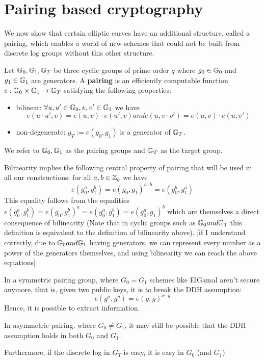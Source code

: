 \section{Pairing based cryptography}
We now show that certain elliptic curves have an additional structure,
called a pairing, which enables a world of new schemes that could not be built
 from discrete log groups without this other structure.

 \begin{defn}
  Let $\mathbb{G}_0, \mathbb{G}_1, \mathbb{G}_T$ be three cyclic groups of prime order $q$ where 
  $g_0\in\mathbb{G}_0$ and $g_1\in\mathbb{G}_1$ are generators. A \textbf{pairing} is an efficiently
  computable function $e: \mathbb{G}_0 \times \mathbb{G}_1 \to \mathbb{G}_T$ satisfying the 
  following properties:
  \begin{itemize}
    \item bilinear: $\forall u,u'\in\mathbb{G}_0, v,v'\in\mathbb{G}_1$  we have 
        $$ e(u\cdot u',v) = e(u,v) \cdot e(u',v) and  e(u,v\cdot v') = e(u,v)\cdot e(u,v')$$
    \item non-degenerate: $g_T := e(g_0,g_1)$  is a generator of $\mathbb{G}_T$.
  \end{itemize}
\end{defn}
We refer to $\mathbb{G}_0,\mathbb{G}_1$ as the pairing groups and $\mathbb{G}_T$ as the target group.

Bilinearity implies the following central property of pairing that will be used
in all our constructions: for all $a, b\in \mathbb{Z}_q$ we have
  $$ e(g_0^a,g_1^b)=e(g_0,g_1)^{a\cdot b}= e(g_0^b,g_1^a)$$
This equality follows from the equalities 
$e(g_0^a,g_1^b)=e(g_0,g_1^b)^a=e(g_0^a,g_1^b)=e(g_0^a,g_1)^b$
which are themselves a direct consequence of bilinearity (Note that in cyclic groups
 such as $\mathbb{G}_0 and \mathbb{G}_1$ this definition is equivalent to the definition of bilinearity above).
[if I understand correctly, due to $\mathbb{G}_0 and \mathbb{G}_1$ having generators, we can represent every number
as a power of the generators themselves, and using bilinearity we can reach the above equations]

In a symmetric pairing group, where $G_0 = G_1$ schemes like ElGamal aren't secure anymore,
that is, given two public keys, it is to break the DDH assumption: 
  $$ e(g^x,g^y) = e(g,g)^{x\cdot y}$$ 
Hence, it is possible to extract information. 

In asymmetric pairing, where $G_0 \neq G_1$, it may still be possible
that the DDH assumption holds in both $G_0$ and $G_1$. 

Furthermore, if the discrete log in $G_T$ is easy, it is easy in $G_0$ (and $G_1$).

